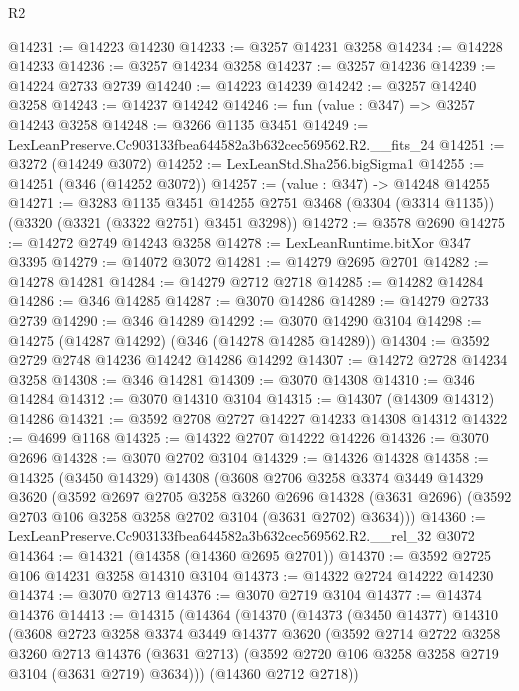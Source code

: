 \begin{lexlean}{R2}
\begin{coremodule}
@14231 := @14223 @14230
@14233 := @3257 @14231 @3258
@14234 := @14228 @14233
@14236 := @3257 @14234 @3258
@14237 := @3257 @14236
@14239 := @14224 @2733 @2739
@14240 := @14223 @14239
@14242 := @3257 @14240 @3258
@14243 := @14237 @14242
@14246 := fun (value : @347) => @3257 @14243 @3258
@14248 := @3266 @1135 @3451
@14249 := LexLeanPreserve.Cc903133fbea644582a3b632cec569562.R2.__fits_24
@14251 := @3272 (@14249 @3072)
@14252 := LexLeanStd.Sha256.bigSigma1
@14255 := @14251 (@346 (@14252 @3072))
@14257 := (value : @347) -> @14248 @14255
@14271 := @3283
    @1135
    @3451
    @14255
    @2751
    @3468
    (@3304 (@3314 @1135))
    (@3320 (@3321 (@3322 @2751) @3451 @3298))
@14272 := @3578 @2690
@14275 := @14272 @2749 @14243 @3258
@14278 := LexLeanRuntime.bitXor @347 @3395
@14279 := @14072 @3072
@14281 := @14279 @2695 @2701
@14282 := @14278 @14281
@14284 := @14279 @2712 @2718
@14285 := @14282 @14284
@14286 := @346 @14285
@14287 := @3070 @14286
@14289 := @14279 @2733 @2739
@14290 := @346 @14289
@14292 := @3070 @14290 @3104
@14298 := @14275 (@14287 @14292) (@346 (@14278 @14285 @14289))
@14304 := @3592 @2729 @2748 @14236 @14242 @14286 @14292
@14307 := @14272 @2728 @14234 @3258
@14308 := @346 @14281
@14309 := @3070 @14308
@14310 := @346 @14284
@14312 := @3070 @14310 @3104
@14315 := @14307 (@14309 @14312) @14286
@14321 := @3592 @2708 @2727 @14227 @14233 @14308 @14312
@14322 := @4699 @1168
@14325 := @14322 @2707 @14222 @14226
@14326 := @3070 @2696
@14328 := @3070 @2702 @3104
@14329 := @14326 @14328
@14358 := @14325
    (@3450 @14329)
    @14308
    (@3608
      @2706
      @3258
      @3374
      @3449
      @14329
      @3620
      (@3592
        @2697
        @2705
        @3258
        @3260
        @2696
        @14328
        (@3631 @2696)
        (@3592 @2703 @106 @3258 @3258 @2702 @3104 (@3631 @2702) @3634)))
@14360 := LexLeanPreserve.Cc903133fbea644582a3b632cec569562.R2.__rel_32 @3072
@14364 := @14321 (@14358 (@14360 @2695 @2701))
@14370 := @3592 @2725 @106 @14231 @3258 @14310 @3104
@14373 := @14322 @2724 @14222 @14230
@14374 := @3070 @2713
@14376 := @3070 @2719 @3104
@14377 := @14374 @14376
@14413 := @14315
    (@14364
      (@14370
        (@14373
          (@3450 @14377)
          @14310
          (@3608
            @2723
            @3258
            @3374
            @3449
            @14377
            @3620
            (@3592
              @2714
              @2722
              @3258
              @3260
              @2713
              @14376
              (@3631 @2713)
              (@3592 @2720 @106 @3258 @3258 @2719 @3104 (@3631 @2719) @3634)))
          (@14360 @2712 @2718))

\end{coremodule}
\end{lexlean}

